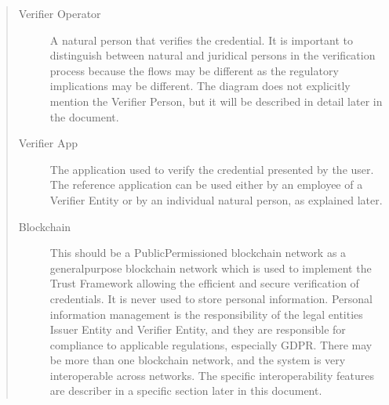 \documentclass[a4paper,12pt,english]{sphinxhowto}
\begin{document}
\begin{quote}
\begin{description}
\item[{Verifier Operator}] \leavevmode
\sphinxAtStartPar
A natural person that verifies the credential. It is important to distinguish between natural and juridical persons in the verification process because the flows may be different as the regulatory implications may be different. The diagram does not explicitly mention the Verifier Person, but it will be described in detail later in the document.

\item[{Verifier App}] \leavevmode
\sphinxAtStartPar
The application used to verify the credential presented by the user. The reference application can be used either by an employee of a Verifier Entity or by an individual natural person, as explained later.

\item[{Blockchain}] \leavevmode
\sphinxAtStartPar
This should be a Public\sphinxhyphen{}Permissioned blockchain network as a general\sphinxhyphen{}purpose blockchain network which is used to implement the Trust Framework allowing the efficient and secure verification of credentials. It is never used to store personal information. Personal information management is the responsibility of the legal entities Issuer Entity and Verifier Entity, and they are responsible for compliance to applicable regulations, especially GDPR. There may be more than one blockchain network, and the system is very interoperable across networks. The specific interoperability features are describer in a specific section later in this document.

\end{description}\end{quote}
\end{document}
